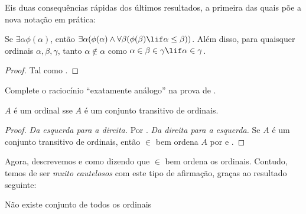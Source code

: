 \documentclass[../../../include/open-logic-section]{subfiles}
\begin{document}
Eis duas consequências rápidas dos últimos resultados, a primeira das
quais põe a nova notação em prática:

\begin{cor}
Se $\exists \alpha\phi(\alpha)$, então $\exists \alpha(\phi(\alpha)
\land \forall \beta(\phi(\beta) \lif \alpha \leq \beta))$.
Além disso, para quaisquer ordinais $\alpha, \beta, \gamma$, tanto $\alpha
\notin \alpha$ como $\alpha \in \beta \in \gamma \lif \alpha \in
\gamma$. 
\end{cor}

\begin{proof}
Tal como .
\end{proof}

\begin{prob}
Complete o raciocínio ``exatamente análogo'' na prova de
.
\end{prob}

\begin{cor}
$A$ é um ordinal sse $A$ é um conjunto transitivo de ordinais.
\end{cor}

\begin{proof}
\emph{Da esquerda para a direita.} Por . \emph{Da direita para a esquerda.}
Se $A$ é um conjunto transitivo de ordinais, então $\in$ bem ordena $A$ por
 e .
\end{proof}

Agora, descrevemos 
 e  como dizendo que $\in$ bem ordena os ordinais. Contudo, temos
de ser \emph{muito cautelosos} com este tipo de afirmação, graças ao
resultado seguinte:

\begin{thm}
Não existe conjunto de todos os ordinais
\end{thm}
\end{document}

